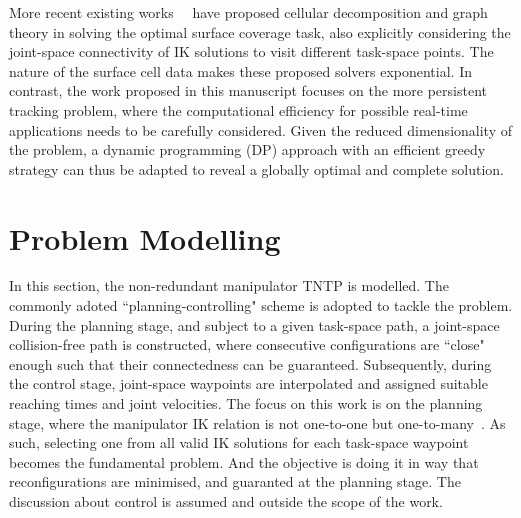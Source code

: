 \documentclass[letterpaper, 10 pt, conference]{ieeeconf}  %
\begin{document}
More recent existing works~\cite{Yang2020Cellular}~\cite{Yang2020Nonrevisiting} have proposed cellular decomposition and graph theory
in solving the optimal surface coverage task, also explicitly considering the joint-space connectivity of IK solutions to visit different task-space points. 
The nature of the surface cell data makes these proposed solvers exponential. 
In contrast, the work proposed in this manuscript focuses on the more persistent tracking problem, where the computational efficiency for possible real-time applications needs to be carefully considered. Given the reduced dimensionality of the problem, a dynamic programming (DP) approach with an efficient greedy strategy can thus be adapted to reveal a globally optimal and complete solution. 


\section{Problem Modelling}\label{section:modelling}
In this section, the non-redundant manipulator TNTP is modelled. The commonly adoted ``planning-controlling" scheme is adopted to tackle the problem. During the planning stage, 
and subject to a given task-space path, a joint-space collision-free path is constructed, where consecutive configurations are ``close" enough such that their connectedness can be guaranteed. 
Subsequently, during the control stage, joint-space waypoints are interpolated and assigned suitable reaching times and joint velocities. 
The focus on this work is on the planning stage, where the manipulator IK relation is not one-to-one but one-to-many~\cite{Lavalle2006Planning}. %
As such, selecting one from all valid IK solutions for each task-space waypoint becomes the fundamental problem. And the objective is doing it in way that reconfigurations are minimised, and guaranted at the planning stage. 
The discussion about control is assumed and outside the scope of the work. 
\end{document}
